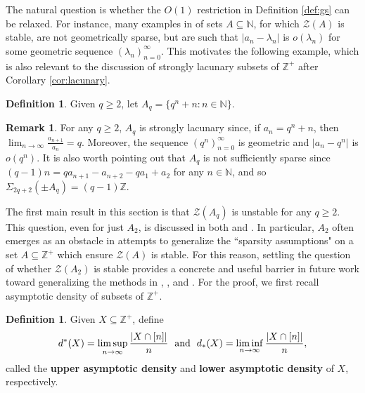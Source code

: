 \documentclass{amsart}
\def\seq{\subseteq}
\newcommand{\mand}{\makebox[.4in]{and}}
\newcommand{\cZ}{\mathcal{Z}}
\def\N{\mathbb N}
\def\Z{\mathbb Z}
\theoremstyle{definition}
\newtheorem{definition}[theorem]{Definition}
\newtheorem{remark}[theorem]{Remark}
\begin{document}
The natural question is whether the $O(1)$ restriction in Definition \ref{def:gs} can be relaxed. For instance, many examples in \cite{PoLa} of sets $A\seq\N$, for which $\cZ(A)$ is stable, are not geometrically sparse, but are such that $|a_n-\lambda_n|$ is $o(\lambda_n)$  for some geometric sequence $(\lambda_n)_{n=0}^\infty$. This motivates the following example, which is also relevant to the discussion of strongly lacunary subsets of $\Z^+$ after Corollary \ref{cor:lacunary}. 

\begin{definition}
Given $q\geq 2$, let $A_q=\{q^n+n:n\in\N\}$.
\end{definition}



\begin{remark}\label{rem:bad}
For any $q\geq 2$, $A_q$ is strongly lacunary since, if $a_n=q^n+n$, then $\lim_{n\to\infty}\frac{a_{n+1}}{a_n}=q$. Moreover, the sequence $(q^n)_{n=0}^\infty$ is geometric and $|a_n-q^n|$ is $o(q^n)$. It is also worth pointing out that $A_q$ is not sufficiently sparse since $(q-1)n=qa_{n+1}-a_{n+2}-qa_1+a_2$ for any $n\in\N$, and so $\Sigma_{2q+2}(\pm A_q)=(q-1)\Z$.
\end{remark}

The first main result in this section is that $\cZ(A_q)$ is unstable for any $q\geq 2$. This question, even for just $A_2$, is discussed in both \cite{CoSS} and \cite{PoLa}. In particular, $A_2$ often emerges as an obstacle in attempts to generalize the ``sparsity assumptions" on a set $A\seq\Z^+$ which ensure $\cZ(A)$ is stable. For this reason, settling the question of whether $\cZ(A_2)$ is stable provides a concrete and useful barrier in future work toward generalizing the methods in \cite{CoSS}, \cite{PoLa}, and \cite{PaSk}. For the proof, we first recall asymptotic density of subsets of $\Z^+$.

\begin{definition}
Given $X\seq\Z^+$, define
\[
d^*(X)=\limsup_{n\to\infty}\frac{|X\cap [n]|}{n}\mand d_*(X)=\liminf_{n\to\infty}\frac{|X\cap[n]|}{n},
\]
called the \textbf{upper asymptotic density} and \textbf{lower asymptotic density} of $X$, respectively.
\end{definition}
\end{document}
